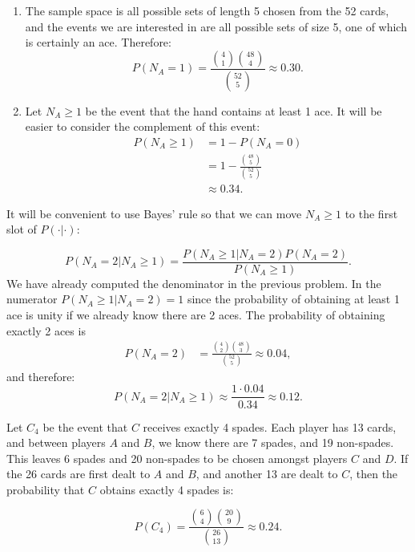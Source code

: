 \begin{problem}{4} $ $

	\begin{enumerate}

		\item The sample space is all possible sets of length 5 chosen from the 52 cards, and the events we are interested in are all possible sets of size 5, one of which is certainly an ace.  Therefore:
		\begin{equation*}
			P(N_A=1) = \frac{\binom{4}{1}\binom{48}{4}}{\binom{52} {5} } \approx 0.30.
		\end{equation*}
	
	
		\item Let $N_A \ge 1$ be the event that the hand contains at least 1 ace.  It will be easier to consider the complement of this event:
			\begin{align*}
				P(N_A \ge 1) &=1-P(N_A =0) \\
				& = 1- \frac{\binom{48}{5}}{\binom{52}{5}} \\
				& \approx 0.34.
			\end{align*}
\end{enumerate}

\end{problem}

\begin{problem}{5} It will be convenient to use Bayes' rule so that we can move $N_A \ge 1$ to the first slot of $P(\cdot | \cdot)$:

\begin{equation}
P(N_A=2|N_A \ge 1) = \frac{P(N_A \ge 1|N_A=2) P(N_A=2)}{P(N_A \ge 1)}.
\end{equation}
We have already computed the denominator in the previous problem.  In the numerator $P(N_A \ge 1|N_A=2) = 1$ since the probability of obtaining at least 1 ace is unity if we already know there are 2 aces.  The probability of obtaining exactly 2 aces is 
\begin{align*}
P(N_A =2) &=\frac{\binom{4}{2}\binom{48}{3}}{\binom{52}{5}} \approx 0.04,
\end{align*}
and therefore:
\begin{equation}
P(N_A=2|N_A \ge 1) \approx \frac{1\cdot 0.04}{0.34} \approx 0.12.
\end{equation}

\end{problem}


\begin{problem}{6} Let $C_4$ be the event that $C$ receives exactly 4 spades.  Each player has 13 cards, and between players $A$ and $B$, we know there are 7 spades, and 19 non-spades.  This leaves 6 spades and 20 non-spades to be chosen amongst players $C$ and $D$.  If the 26 cards are first dealt to $A$ and $B$, and another 13 are dealt to $C$, then the probability that $C$ obtains exactly 4 spades is:

\begin{equation*}
P(C_4) = \frac{\binom{6}{4}\binom{20}{9}}{\binom{26}{13}} \approx 0.24.
\end{equation*}

\end{problem}

